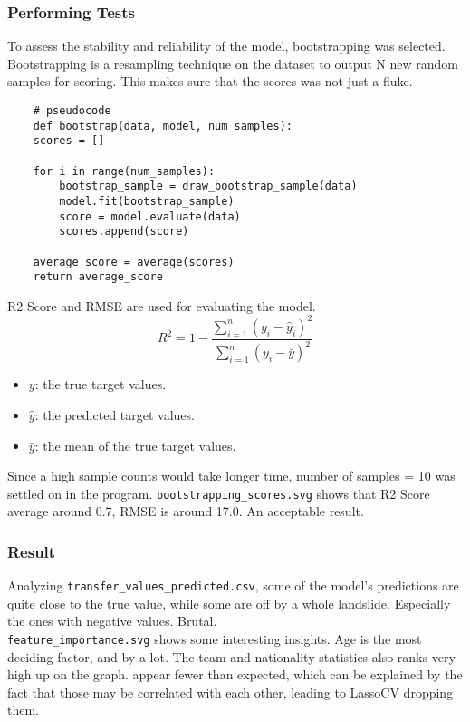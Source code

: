 \documentclass{report}
\begin{document}
\subsubsection{Performing Tests}
To assess the stability and reliability of the model, bootstrapping was selected. Bootstrapping is a 
resampling technique on the dataset to output N new random samples for scoring. This makes sure that 
the scores was not just a fluke. \\
\begin{verbatim}
    # pseudocode
    def bootstrap(data, model, num_samples):
    scores = []
    
    for i in range(num_samples):
        bootstrap_sample = draw_bootstrap_sample(data)
        model.fit(bootstrap_sample)
        score = model.evaluate(data)
        scores.append(score)
    
    average_score = average(scores)
    return average_score
\end{verbatim}

R2 Score and RMSE are used for evaluating the model.
\[ R^2 = 1 - \frac{\sum_{i=1}^{n} (y_i - \hat{y}_i)^2}{\sum_{i=1}^{n} (y_i - \bar{y})^2} \]
\begin{itemize}
    \item \( y \): the true target values.
    \item \( \hat{y} \): the predicted target values.
    \item \( \bar{y} \): the mean of the true target values.
\end{itemize}

Since a high sample counts would take longer time, number of samples = 10 was settled on in the program.
\verb|bootstrapping_scores.svg| shows that R2 Score average around 0.7, RMSE is around 17.0. An 
acceptable result.

\subsubsection{Result}
Analyzing \verb|transfer_values_predicted.csv|, some of the model's predictions are quite close to
the true value, while some are off by a whole landslide. Especially the ones with negative values. 
Brutal. \\
\verb|feature_importance.svg| shows some interesting insights. Age is the most deciding factor, and
by a lot. The team and nationality statistics also ranks very high up on the graph. appear fewer than 
expected, which can be explained by the fact that those may be correlated with each other, leading 
to LassoCV dropping them.
\end{document}
